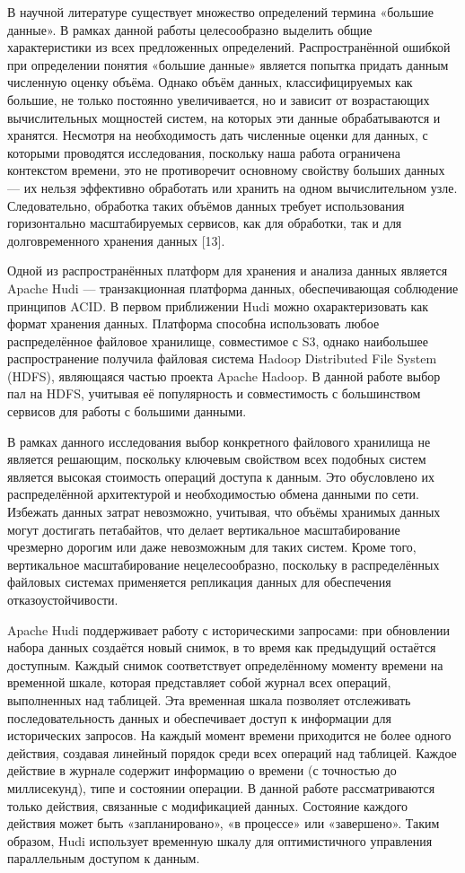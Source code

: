 В научной литературе существует множество определений термина «большие данные». В рамках данной работы целесообразно выделить общие характеристики из всех предложенных определений. Распространённой ошибкой при определении понятия «большие данные» является попытка придать данным численную оценку объёма. Однако объём данных, классифицируемых как большие, не только постоянно увеличивается, но и зависит от возрастающих вычислительных мощностей систем, на которых эти данные обрабатываются и хранятся. Несмотря на необходимость дать численные оценки для данных, с которыми проводятся исследования, поскольку наша работа ограничена контекстом времени, это не противоречит основному свойству больших данных — их нельзя эффективно обработать или хранить на одном вычислительном узле. Следовательно, обработка таких объёмов данных требует использования горизонтально масштабируемых сервисов, как для обработки, так и для долговременного хранения данных [13].

Одной из распространённых платформ для хранения и анализа данных является Apache Hudi — транзакционная платформа данных, обеспечивающая соблюдение принципов ACID. В первом приближении Hudi можно охарактеризовать как формат хранения данных. Платформа способна использовать любое распределённое файловое хранилище, совместимое с S3, однако наибольшее распространение получила файловая система Hadoop Distributed File System (HDFS), являющаяся частью проекта Apache Hadoop. В данной работе выбор пал на HDFS, учитывая её популярность и совместимость с большинством сервисов для работы с большими данными.

В рамках данного исследования выбор конкретного файлового хранилища не является решающим, поскольку ключевым свойством всех подобных систем является высокая стоимость операций доступа к данным. Это обусловлено их распределённой архитектурой и необходимостью обмена данными по сети. Избежать данных затрат невозможно, учитывая, что объёмы хранимых данных могут достигать петабайтов, что делает вертикальное масштабирование чрезмерно дорогим или даже невозможным для таких систем. Кроме того, вертикальное масштабирование нецелесообразно, поскольку в распределённых файловых системах применяется репликация данных для обеспечения отказоустойчивости.

Apache Hudi поддерживает работу с историческими запросами: при обновлении набора данных создаётся новый снимок, в то время как предыдущий остаётся доступным. Каждый снимок соответствует определённому моменту времени на временной шкале, которая представляет собой журнал всех операций, выполненных над таблицей. Эта временная шкала позволяет отслеживать последовательность данных и обеспечивает доступ к информации для исторических запросов. На каждый момент времени приходится не более одного действия, создавая линейный порядок среди всех операций над таблицей. Каждое действие в журнале содержит информацию о времени (с точностью до миллисекунд), типе и состоянии операции. В данной работе рассматриваются только действия, связанные с модификацией данных. Состояние каждого действия может быть «запланировано», «в процессе» или «завершено». Таким образом, Hudi использует временную шкалу для оптимистичного управления параллельным доступом к данным.

